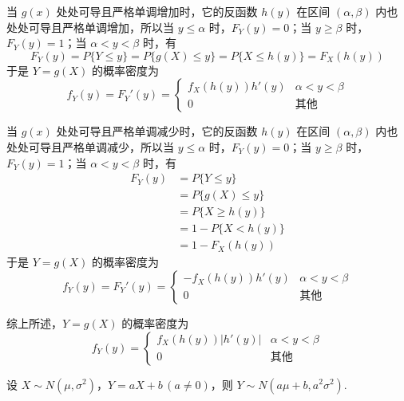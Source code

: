 \begin{myproof}
    当 $g(x)$ 处处可导且严格单调增加时，它的反函数 $h(y)$ 在区间 $(\alpha,\beta)$ 内也处处可导且严格单调增加，所以当 $y \leqslant \alpha$ 时，$F_{Y}(y)=0$；当 $y \geqslant \beta$ 时，$F_{Y}(y)=1$；当 $\alpha < y < \beta$ 时，有
    $$
    F_{Y}(y) = P\{Y \leqslant y\} = P\{g(X) \leqslant y\} = P\{X \leqslant h(y)\} = F_{X}(h(y))
    $$
    于是 $Y=g(X)$ 的概率密度为
    $$
    f_{Y}(y)=F_{Y}'(y)=\begin{cases}
        f_{X}(h(y)) h'(y) & \alpha < y < \beta \\
        0 & \text{其他}
    \end{cases}
    $$

    当 $g(x)$ 处处可导且严格单调减少时，它的反函数 $h(y)$ 在区间 $(\alpha,\beta)$ 内也处处可导且严格单调减少，所以当 $y \leqslant \alpha$ 时，$F_{Y}(y)=0$；当 $y \geqslant \beta$ 时，$F_{Y}(y)=1$；当 $\alpha < y < \beta$ 时，有
    $$
    \begin{aligned}
        F_{Y}(y) &= P\{Y \leqslant y\} \\
        &= P\{g(X) \leqslant y\} \\
        &= P\{X \geqslant h(y)\} \\
        &= 1-P\{X < h(y)\}\\
        &= 1-F_{X}(h(y))
    \end{aligned}
    $$
    于是 $Y=g(X)$ 的概率密度为
    $$
    f_{Y}(y)=F_{Y}'(y)=\begin{cases}
        -f_{X}(h(y)) h'(y) & \alpha < y < \beta \\
        0 & \text{其他}
    \end{cases}
    $$

    综上所述，$Y=g(X)$ 的概率密度为
    $$
    f_{Y}(y)=\begin{cases}
        f_{X}(h(y))|h'(y)| & \alpha < y < \beta \\
        0 & \text{其他}
    \end{cases}
    $$
\end{myproof}

\begin{conclusion}
    设 $X \sim N(\mu,\sigma^2)$，$Y=aX+b \, (a \not= 0)$，则 $Y \sim N(a \mu + b, a^2 \sigma^2)$.
\end{conclusion}

